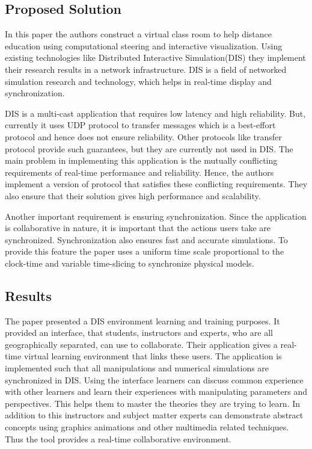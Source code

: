 \documentclass[12pt, onecolumn]{IEEEtran}
\begin{document}
\subsection{Proposed Solution}
In this paper the authors construct a virtual class room to help distance
education using computational steering and interactive visualization. Using
existing technologies like Distributed Interactive Simulation(DIS) they
implement their research results in a network infrastructure. DIS is a field of
networked simulation research and technology, which helps in real-time display
and synchronization. 

DIS is a multi-cast application that requires low latency and high reliability.
But, currently it uses UDP protocol to transfer messages which is a best-effort
protocol and hence does not ensure reliability. Other protocols like transfer
protocol provide such guarantees, but they are currently not used in DIS. The
main problem in implementing this application is the mutually conflicting
requirements of real-time performance and reliability. Hence, the authors
implement a version of protocol that satisfies these conflicting requirements.
They also ensure that their solution gives high performance and scalability.

Another important requirement is ensuring synchronization. Since the
application is collaborative in nature, it is important that the actions users
take are synchronized. Synchronization also ensures fast and accurate
simulations.  To provide this feature the paper uses a uniform time scale
proportional to the clock-time and variable time-slicing to synchronize physical
models.

\subsection{Results}
The paper presented a DIS environment learning and training purposes. It
provided an interface, that students, instructors and experts, who are all
geographically separated, can use to collaborate. Their application gives a
real-time virtual learning environment that links these users. The application
is implemented such that all manipulations and numerical simulations are
synchronized in DIS. Using the interface learners can discuss common experience
with other learners and learn their experiences with manipulating parameters
and perspectives. This helps them to master the theories they are trying to
learn. In addition to this instructors and subject matter experts can
demonstrate abstract concepts using graphics animations and other
multimedia related techniques. Thus the tool provides a real-time collaborative
environment.
\\
\end{document}
